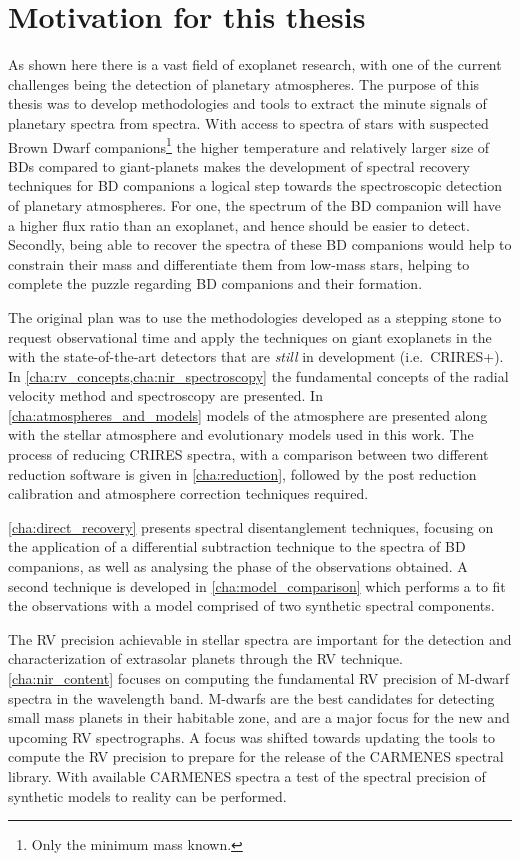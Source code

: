 \section{Motivation for this thesis}
\label{sec:thesis_motivation}

As shown here there is a vast field of exoplanet research, with one of the current challenges being the detection of planetary atmospheres.
The purpose of this thesis was to develop methodologies and tools to extract the minute signals of planetary spectra from \nir{} spectra.
With access to \nir{} spectra of stars with suspected Brown Dwarf companions\footnote{Only the minimum mass \Mtwosini{} known.} the higher temperature and relatively larger size of {BD}s compared to giant-planets makes the development of spectral recovery techniques for {BD} companions a logical step towards the spectroscopic detection of planetary atmospheres.
For one, the spectrum of the {BD} companion will have a higher flux ratio than an exoplanet, and hence should be easier to detect.
Secondly, being able to recover the spectra of these {BD} companions would help to constrain their mass and differentiate them from low-mass stars, helping to complete the puzzle regarding {BD} companions and their formation.

The original plan was to use the methodologies developed as a stepping stone to request observational time and apply the techniques on giant exoplanets in the \nir{} with the state-of-the-art detectors that are \emph{still} in development (i.e.\ {CRIRES+}).
In \cref{cha:rv_concepts,cha:nir_spectroscopy} the fundamental concepts of the radial velocity method and \nir{} spectroscopy are presented.
In \cref{cha:atmospheres_and_models} models of the atmosphere are presented along with the stellar atmosphere and evolutionary models used in this work.
The process of reducing \nir{} {CRIRES} spectra, with a comparison between two different reduction software is given in \cref{cha:reduction}, followed by the post reduction calibration and atmosphere correction techniques required.

\cref{cha:direct_recovery} presents spectral disentanglement techniques, focusing on the application of a differential subtraction technique to the \nir{} spectra of {BD} companions, as well as analysing the phase of the observations obtained.
A second technique is developed in \cref{cha:model_comparison} which performs a to fit the observations with a model comprised of two synthetic spectral components.

The {RV} precision achievable in stellar spectra are important for the detection and characterization of extrasolar planets through the RV technique.
\cref{cha:nir_content} focuses on computing the fundamental {RV} precision of {M-dwarf} spectra in the \nir{} wavelength band.
{M-dwarf}s are the best candidates for detecting small mass planets in their habitable zone, and are a major focus for the new and upcoming \nir{} {RV} spectrographs.
A focus was shifted towards updating the tools to compute the {RV} precision to prepare for the release of the {CARMENES} \nir{} spectral library.
With available {CARMENES} spectra a test of the spectral precision of synthetic models to reality can be performed.
